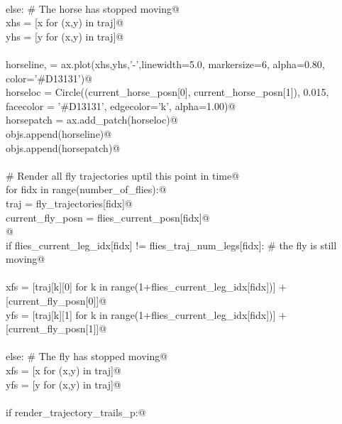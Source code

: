 \documentclass[12.0pt]{report}
\begin{document}
\begin{appendices}
\begin{flushleft}
\begin{list}{}{}
\mbox{}\verb@@\\
\mbox{}\verb@            else: # The horse has stopped moving@\\
\mbox{}\verb@                  xhs = [x for (x,y) in traj]@\\
\mbox{}\verb@                  yhs = [y for (x,y) in traj]@\\
\mbox{}\verb@@\\
\mbox{}\verb@            horseline, = ax.plot(xhs,yhs,'-',linewidth=5.0, markersize=6, alpha=0.80, color='#D13131')@\\
\mbox{}\verb@            horseloc   = Circle((current_horse_posn[0], current_horse_posn[1]), 0.015, facecolor = '#D13131', edgecolor='k',  alpha=1.00)@\\
\mbox{}\verb@            horsepatch = ax.add_patch(horseloc)@\\
\mbox{}\verb@            objs.append(horseline)@\\
\mbox{}\verb@            objs.append(horsepatch)@\\
\mbox{}\verb@@\\
\mbox{}\verb@        # Render all fly trajectories uptil this point in time@\\
\mbox{}\verb@        for fidx in range(number_of_flies):@\\
\mbox{}\verb@            traj               = fly_trajectories[fidx]@\\
\mbox{}\verb@            current_fly_posn   = flies_current_posn[fidx]@\\
\mbox{}\verb@            @\\
\mbox{}\verb@            if flies_current_leg_idx[fidx] != flies_traj_num_legs[fidx]: # the fly is still moving@\\
\mbox{}\verb@@\\
\mbox{}\verb@                  xfs = [traj[k][0] for k in range(1+flies_current_leg_idx[fidx])] + [current_fly_posn[0]]@\\
\mbox{}\verb@                  yfs = [traj[k][1] for k in range(1+flies_current_leg_idx[fidx])] + [current_fly_posn[1]]@\\
\mbox{}\verb@@\\
\mbox{}\verb@            else: # The fly has stopped moving@\\
\mbox{}\verb@                  xfs = [x for (x,y) in traj]@\\
\mbox{}\verb@                  yfs = [y for (x,y) in traj]@\\
\mbox{}\verb@@\\
\mbox{}\verb@            if render_trajectory_trails_p:@\\

\end{list}
\end{flushleft}
\end{appendices}
\end{document}
